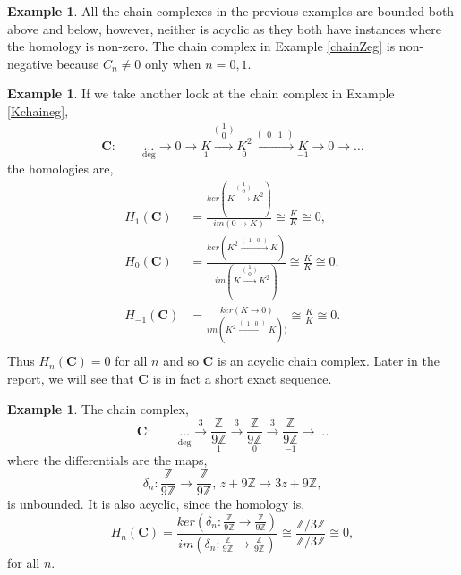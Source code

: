 \documentclass[11.5pt, twoside, a4paper, titlepage]{report}
\providecommand{\equ}[0]{\begin{equation*}}
\providecommand{\eequ}[0] {\end{equation*}}
\providecommand{\bb}[1]{\mathbb{#1}}
\theoremstyle{definition}
\newtheorem{eg}[mydef]{Example}
\theoremstyle{plain}
\begin{document}
\begin{eg}
All the chain complexes in the previous examples are bounded both above and below, however, neither is acyclic as they both have instances where the homology is non-zero. The chain complex in Example \ref{chainZeg} is non-negative because $C_n\neq 0$ only when $n=0,1$.
\end{eg}

\begin{eg}
If we take another look at the chain complex in Example \ref{Kchaineg},
\equ
\mathbf{C}: \qquad \underset{\text{deg}}{\dots} \xrightarrow{} 0 \xrightarrow{} \underset{1}{K} \xrightarrow{\big(\begin{smallmatrix} 1\\ 0 \end{smallmatrix}\big)} \underset{0}{K^2} \xrightarrow{(\begin{smallmatrix}0 & 1 \end{smallmatrix})}\underset{-1}{K} \xrightarrow{} 0 \xrightarrow{} \dots
\eequ
the homologies are, 
\begin{align*}
H_1(\mathbf{C}) &=\frac{ker(K\xrightarrow{\big(\begin{smallmatrix} 1\\ 0 \end{smallmatrix}\big)}K^2)}{im(0 \xrightarrow{}K)}\cong \frac{K}{K} \cong 0,\\
H_0(\mathbf{C}) &=\frac{ker(K^2\xrightarrow{(\begin{smallmatrix} 1 & 0 \end{smallmatrix})}K)}{im(K\xrightarrow{\big(\begin{smallmatrix} 1\\ 0 \end{smallmatrix}\big)}K^2)}\cong \frac{K}{K} \cong 0,\\
H_{-1}(\mathbf{C}) &=\frac{ker(K\xrightarrow{}0)}{im(K^2\xrightarrow{(\begin{smallmatrix} 1 & 0 \end{smallmatrix})}K))}\cong \frac{K}{K} \cong 0.\\
\end{align*}
Thus $H_n(\mathbf{C})=0$ for all $n$ and so $\mathbf{C}$ is an acyclic chain complex. Later in the report, we will see that $\mathbf{C}$ is in fact a short exact sequence.
\end{eg}

\begin{eg}
The chain complex,
\equ
\mathbf{C}: \qquad \underset{\text{deg}}{\underset{}{\dots}} \xrightarrow{3}\underset{1}{\frac{\bb{Z}}{9\bb{Z}}} \xrightarrow{3}\underset{0}{\frac{\bb{Z}}{9\bb{Z}}} \xrightarrow{3}\underset{-1}{\frac{\bb{Z}}{9\bb{Z}}} \xrightarrow{} \dots
\eequ
where the differentials are the maps,
\equ
\delta_n:\frac{\bb{Z}}{9\bb{Z}}\xrightarrow{}\frac{\bb{Z}}{9\bb{Z}}\text{, } z+9\bb{Z}\mapsto 3z+9\bb{Z},
\eequ
is unbounded. It is also acyclic, since the homology is,
\equ
H_n(\mathbf{C})=\frac{ker(\delta_n:\frac{\bb{Z}}{9\bb{Z}}\xrightarrow{}\frac{\bb{Z}}{9\bb{Z}})}{im(\delta_n:\frac{\bb{Z}}{9\bb{Z}}\xrightarrow{}\frac{\bb{Z}}{9\bb{Z}})}\cong \frac{\bb{Z}/3\bb{Z}}{\bb{Z}/3\bb{Z}} \cong 0, 
\eequ
for all $n$.
\end{eg}
\end{document}
